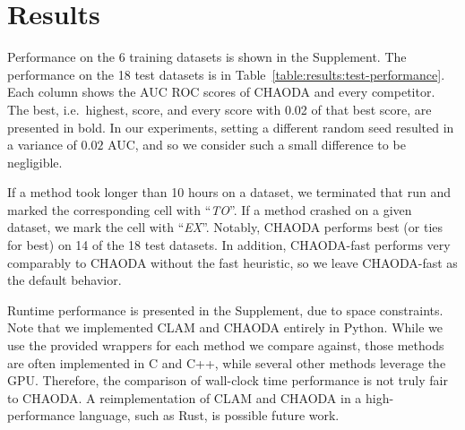 \section{Results}
\label{sec:results}

Performance on the 6 training datasets is shown in the Supplement.
The performance on the 18 test datasets is in Table~\ref{table:results:test-performance}.
Each column shows the AUC ROC scores of CHAODA and every competitor.
The best, i.e.\ highest, score, and every score with 0.02 of that best score, are presented in bold.
In our experiments, setting a different random seed resulted in a variance of $0.02$ AUC, and so we consider such a small difference to be negligible.

If a method took longer than 10 hours on a dataset, we terminated that run and marked the corresponding cell with ``\textit{TO}''.
If a method crashed on a given dataset, we mark the cell with ``\textit{EX}''.
Notably, CHAODA performs best (or ties for best) on 14 of the 18 test datasets.
In addition, CHAODA-fast performs very comparably to CHAODA without the fast heuristic, so we leave CHAODA-fast as the default behavior.

Runtime performance is presented in the Supplement, due to space constraints. 
Note that we implemented CLAM and CHAODA entirely in Python.
While we use the provided wrappers for each method we compare against, those methods are often implemented in C and C++, while several other methods leverage the GPU.
Therefore, the comparison of wall-clock time performance is not truly fair to CHAODA.
A reimplementation of CLAM and CHAODA in a high-performance language, such as Rust, is possible future work.


